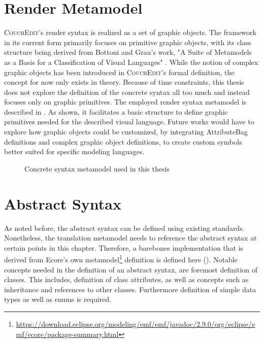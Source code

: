 \section{Render Metamodel}
\textsc{CouchEdit}'s render syntax is realized as a set of graphic objects. The framework in its current form primarily focuses on primitive graphic objects, with its class structure being derived from Bottoni and Grau's work, "A Suite of Metamodels as a Basis for a Classification of Visual Languages" \cite{nachreiner_couchedit_2020, bottoni_suite_2004}. While the notion of complex graphic objects has been introduced in \textsc{CouchEdit}'s formal definition, the concept for now only exists in theory. Because of time constraints, this thesis does not explore the definition of the concrete syntax all too much and instead focuses only on graphic primitives. The employed render syntax metamodel is described in . As shown, it facilitates a basic structure to define graphic primitives needed for the described visual language. Future works would have to explore how graphic objects could be customized, by integrating AttributeBag definitions and complex graphic object definitions, to create custom symbols better suited for specific modeling languages.

\begin{figure}[h]
  \centering
  
  \caption{Concrete syntax metamodel used in this thesis}
  \label{fig:concretesyntax}
\end{figure}


\section{Abstract Syntax}
\label{sec:abstract-syntax}
As noted before, the abstract syntax can be defined using existing standards. Nonetheless, the translation metamodel needs to reference the abstract syntax at certain points in this chapter. Therefore, a barebones implementation that is derived from Ecore's own metamodel\footnote{\url{https://download.eclipse.org/modeling/emf/emf/javadoc/2.9.0/org/eclipse/emf/ecore/package-summary.html}} definition is defined here (). Notable concepts needed in the definition of an abstract syntax, are foremost definition of classes. This includes, definition of class attributes, as well as concepts such as inheritance and references to other classes. Furthermore definition of simple data types as well as enums is required.

